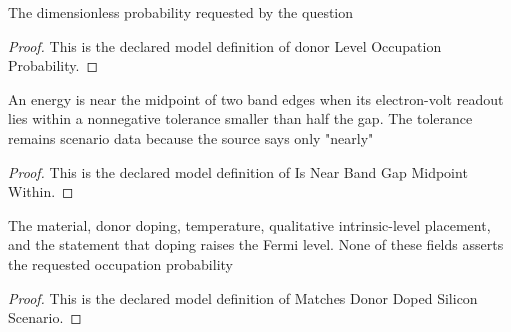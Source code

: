 \begin{definition}
  \label{def:physics:phyx-mini-0575:phyxminiproblems-problemphyxmini0575-donorleveloccupationprobability}
  The dimensionless probability requested by the question
\end{definition}
\begin{proof}
  This is the declared model definition of donor Level Occupation Probability.
\end{proof}
\begin{definition}
  \label{def:physics:phyx-mini-0575:phyxminiproblems-problemphyxmini0575-isnearbandgapmidpointwithin}
  An energy is near the midpoint of two band edges when its electron-volt readout lies within a nonnegative tolerance smaller than half the gap. The tolerance remains scenario data because the source says only "nearly"
\end{definition}
\begin{proof}
  This is the declared model definition of Is Near Band Gap Midpoint Within.
\end{proof}
\begin{definition}
  \label{def:physics:phyx-mini-0575:phyxminiproblems-problemphyxmini0575-matchesdonordopedsiliconscenario}
  The material, donor doping, temperature, qualitative intrinsic-level placement, and the statement that doping raises the Fermi level. None of these fields asserts the requested occupation probability
\end{definition}
\begin{proof}
  This is the declared model definition of Matches Donor Doped Silicon Scenario.
\end{proof}
